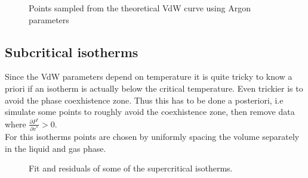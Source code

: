 \documentclass[a4paper, 11pt]{article}
\begin{document}

    \begin{figure}[H]
      \centering
       \hspace{-0.3cm}
       \hspace{-0.3cm}
      \caption{Points sampled from the theoretical VdW curve using Argon parameters}
      \label{fig:v_spacing}
    \end{figure}

    \subsection{Subcritical isotherms}
      Since the VdW parameters depend on temperature it is quite tricky to know a priori if an isotherm is actually below the critical temperature. Even trickier is to avoid the phase coexhistence zone. Thus this has to be done a posteriori, i.e simulate some points to roughly avoid the coexhistence zone, then remove data where $\frac{\partial P^*}{\partial v^*} > 0$. \\
      For this isotherms points are chosen by uniformly spacing the volume separately in the liquid and gas phase.

    \begin{figure}[H]
      \centering
       \hspace{-0.5cm}
      \caption{Fit and residuals of some of the supercritical isotherms.}
      \label{fig:fit_isotherms}
    \end{figure}
\end{document}
